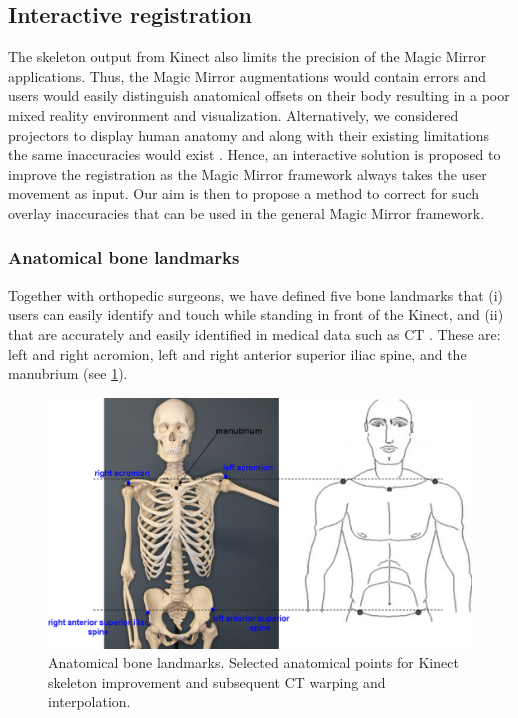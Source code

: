 \subsection{Interactive registration}
The skeleton output from Kinect also limits the precision of the Magic Mirror applications. Thus, the Magic Mirror augmentations would contain errors and users would easily distinguish anatomical offsets on their body resulting in a poor mixed reality environment and visualization. Alternatively, we considered projectors to display human anatomy and along with their existing limitations the same inaccuracies would exist \cite{Sun2013}. 
Hence, an interactive solution is proposed to improve the registration as the Magic Mirror framework always takes the user movement as input.
Our aim is then to propose a method to correct for such overlay inaccuracies that can be used in the general Magic Mirror framework. 

\subsubsection{Anatomical bone landmarks}
Together with orthopedic surgeons, we have defined five bone landmarks that (i) users can easily identify and touch while standing in front of the Kinect, and (ii) that are accurately and easily identified in medical data such as CT \cite{ma2013ismar}. These are: left and right acromion, left and right anterior superior iliac spine, and the manubrium (see \figurename{\ref{fig:3-PRMM:bonelandmarker}}).
\begin{figure}[htb]
	\centering
	\includegraphics[width = \linewidth]{figures/3-PRMM/FiveBoneLandmarker.png}
	\caption{Anatomical bone landmarks. Selected anatomical points for Kinect skeleton improvement and subsequent CT warping and interpolation.}
	\label{fig:3-PRMM:bonelandmarker}
\end{figure}

